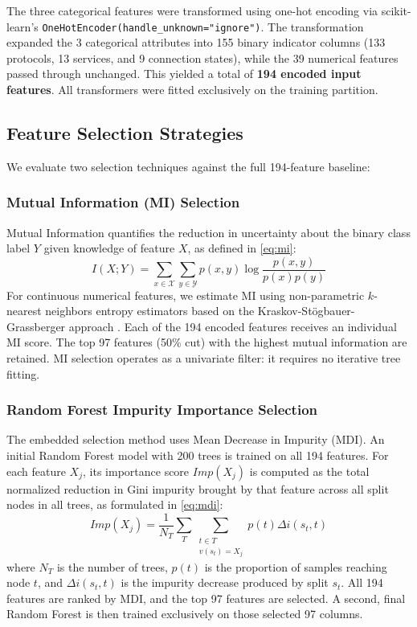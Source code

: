 \documentclass[conference]{IEEEtran}
\begin{document}
The three categorical features were transformed using one-hot encoding via scikit-learn's \texttt{OneHotEncoder(handle\_unknown="ignore")}. The transformation expanded the 3 categorical attributes into 155 binary indicator columns (133 protocols, 13 services, and 9 connection states), while the 39 numerical features passed through unchanged. This yielded a total of \textbf{194 encoded input features}. All transformers were fitted exclusively on the training partition.

\subsection{Feature Selection Strategies}
We evaluate two selection techniques against the full 194-feature baseline:

\subsubsection{Mutual Information (MI) Selection}
Mutual Information quantifies the reduction in uncertainty about the binary class label $Y$ given knowledge of feature $X$, as defined in \eqref{eq:mi}:
\begin{equation}
I(X; Y) = \sum_{x \in \mathcal{X}} \sum_{y \in \mathcal{Y}} p(x, y) \log \frac{p(x, y)}{p(x)p(y)}
\label{eq:mi}
\end{equation}
For continuous numerical features, we estimate MI using non-parametric $k$-nearest neighbors entropy estimators based on the Kraskov-St\"ogbauer-Grassberger approach \cite{kraskov2004estimating}. Each of the 194 encoded features receives an individual MI score. The top 97 features (50\% cut) with the highest mutual information are retained. MI selection operates as a univariate filter: it requires no iterative tree fitting.

\subsubsection{Random Forest Impurity Importance Selection}
The embedded selection method uses Mean Decrease in Impurity (MDI). An initial Random Forest model with 200 trees is trained on all 194 features. For each feature $X_j$, its importance score $Imp(X_j)$ is computed as the total normalized reduction in Gini impurity brought by that feature across all split nodes in all trees, as formulated in \eqref{eq:mdi}:
\begin{equation}
Imp(X_j) = \frac{1}{N_T} \sum_{T} \sum_{\substack{t \in T \\ v(s_t) = X_j}} p(t) \Delta i(s_t, t)
\label{eq:mdi}
\end{equation}
where $N_T$ is the number of trees, $p(t)$ is the proportion of samples reaching node $t$, and $\Delta i(s_t, t)$ is the impurity decrease produced by split $s_t$. All 194 features are ranked by MDI, and the top 97 features are selected. A second, final Random Forest is then trained exclusively on those selected 97 columns.
\end{document}
